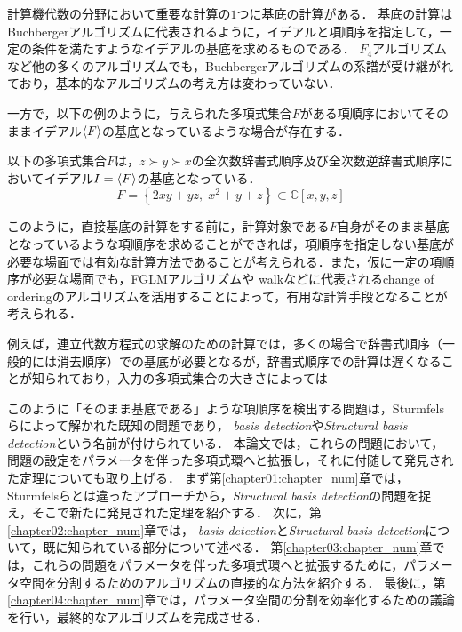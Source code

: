 \phantom{fight!}\par

計算機代数の分野において重要な計算の$1$つに\groebner{}基底の計算がある．
\groebner{}基底の計算はBuchbergerアルゴリズム\cite{buchberger2006bruno}に代表されるように，イデアルと項順序を指定して，一定の条件を満たすようなイデアルの基底を求めるものである．
$F_4$アルゴリズム\cite{faugere1999new}など他の多くのアルゴリズムでも，Buchbergerアルゴリズムの系譜が受け継がれており，基本的なアルゴリズムの考え方は変わっていない．
\par
一方で，以下の例のように，与えられた多項式集合$F$がある項順序においてそのままイデアル$\langle F \rangle$の\groebner{}基底となっているような場合が存在する．
\begin{example*}
	以下の多項式集合$F$は，$z \succ y \succ x$の全次数辞書式順序及び全次数逆辞書式順序においてイデアル$I = \langle F \rangle$の\groebner{}基底となっている．
	$$F = \left\{ 2xy + yz, \; x^2 + y + z \right\} \subset \mathbb{C}[x, y, z]$$
\end{example*}
このように，直接\groebner{}基底の計算をする前に，計算対象である$F$自身がそのまま\groebner{}基底となっているような項順序を求めることができれば，項順序を指定しない\groebner{}基底が必要な場面では有効な計算方法であることが考えられる．また，仮に一定の項順序が必要な場面でも，FGLMアルゴリズム\cite{faugere1993efficient}や\groebner{} walk\cite{collart1993grobner}などに代表されるchange of orderingのアルゴリズムを活用することによって，有用な計算手段となることが考えられる．
\par
例えば，連立代数方程式の求解のための計算では，多くの場合で辞書式順序（一般的には消去順序）での\groebner{}基底が必要となるが，辞書式順序での計算は遅くなることが知られており，入力の多項式集合の大きさによっては
\par
このように「そのまま\groebner{}基底である」ような項順序を検出する問題は，Sturmfelsらによって解かれた既知の問題であり，\emph{\groebner{} basis detection}\cite{gritzmann1993minkowski}や\emph{Structural \groebner{} basis detection}\cite{sturmfels1997structural}という名前が付けられている．
本論文では，これらの問題において，問題の設定をパラメータを伴った多項式環へと拡張し，それに付随して発見された定理についても取り上げる．
まず第\ref{chapter01:chapter_num}章では，Sturmfelsらとは違ったアプローチから，\emph{Structural \groebner{} basis detection}の問題を捉え，そこで新たに発見された定理を紹介する．
次に，第\ref{chapter02:chapter_num}章では，\emph{\groebner{} basis detection}と\emph{Structural \groebner{} basis detection}について，既に知られている部分について述べる．
第\ref{chapter03:chapter_num}章では，これらの問題をパラメータを伴った多項式環へと拡張するために，パラメータ空間を分割するためのアルゴリズムの直接的な方法を紹介する．
最後に，第\ref{chapter04:chapter_num}章では，パラメータ空間の分割を効率化するための議論を行い，最終的なアルゴリズムを完成させる．
